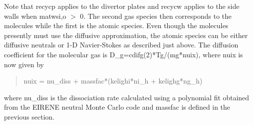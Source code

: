 \documentclass [12pt]{article}
\def\hsa{\hskip.4truein}
\def\hsp6{\hskip.6truein}
\begin{document}
{\sf
{}
}

Note that {\sf recycp} applies to the divertor plates and {\sf recycw} applies
to the side walls when {\sf matwsi,o $>$ 0}.  The second gas species then
corresponds to the molecules while the first is the atomic species.  Even
though the molecules presently must use the diffusive approximation, the
atomic species can be either diffusive neutrals or 1-D Navier-Stokes as
described just above.  The diffusion coefficient for the molecular gas is
D\_g=cdifg(2)*Tg/(mg*nuix), where {\sf nuix} is now given by
\begin{verse} \sf
     nuix = nu\_diss + massfac*(kelighi*ni\_h + kelighg*ng\_h)
\end{verse}
where nu\_diss is the dissociation rate calculated using a polynomial fit
obtained from the {\sf EIRENE} neutral Monte Carlo code and {\sf massfac} is
defined in the previous section.
\end{document}
